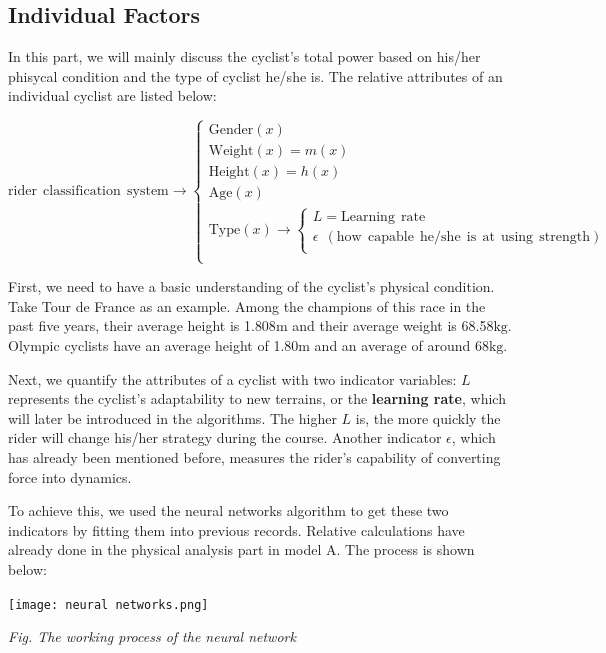 \documentclass{article}
\begin{document}
		\subsection{Individual Factors}
			In this part, we will mainly discuss the cyclist's total power based on his/her phisycal condition and the type of cyclist he/she is. The relative attributes of an individual cyclist are listed below:

			\[\boxed{\mathrm{rider\:\:classification\:\:system}} \rightarrow \begin{cases}
				\mathrm{Gender}\left( x \right)\\
				\mathrm{Weight}\left( x \right)=m(x)\\
				\mathrm{Height}\left( x \right)=h(x)\\
				\mathrm{Age}\left( x \right)\\
				\mathrm{Type}\left( x \right) \rightarrow \begin{cases}
				L=\mathrm{Learning}\:\:\mathrm{rate}\\
				\epsilon\:\:(\mathrm{how\:\:capable\:\:he/she\:\:is\:\:at\:\:using\:\:strength})\\
			\end{cases}\\
			\end{cases}\]

			First, we need to have a basic understanding of the cyclist's physical condition. Take Tour de France as an example\cite{france}. Among the champions of this race in the past five years, their average height is 1.808$\mathrm{m}$ and their average weight is 68.58$\mathrm{kg}$. Olympic cyclists have an average height of 1.80$\mathrm{m}$ and an average of around 68$\mathrm{kg}$\cite{weight}.

			Next, we quantify the attributes of a cyclist with two indicator variables: \(L\) represents the cyclist's adaptability to new terrains, or the \textbf{learning rate}, which will later be introduced in the algorithms. The higher \(L\) is, the more quickly the rider will change his/her strategy during the course. Another indicator \(\epsilon\), which has already been mentioned before, measures the rider's capability of converting force into dynamics.

			To achieve this, we used the neural networks algorithm to get these two indicators by fitting them into previous records. Relative calculations have already done in the physical analysis part in model A. The process is shown below:

			\begin{center}
				\texttt{[image: neural networks.png]}

				\small\textit{Fig. The working process of the neural network}
			\end{center}
\end{document}
